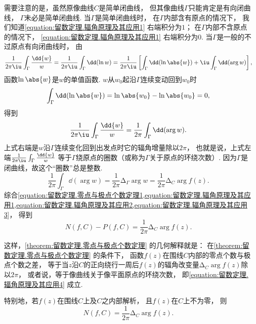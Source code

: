 需要注意的是，虽然原像曲线\(C\)是简单闭曲线，
但其像曲线\(\Gamma\)只能肯定是有向闭曲线，
\(\Gamma\)未必是简单闭曲线.
当\(\Gamma\)是简单闭曲线时，
在\(\Gamma\)内部含有原点的情况下，
我们知道\cref{equation:留数定理.辐角原理及其应用1} 右端积分为\(1\)；
在\(\Gamma\)内部不含原点的情况下，
\cref{equation:留数定理.辐角原理及其应用1} 右端积分为\(0\).
当\(\Gamma\)是一般的不过原点有向闭曲线时，
由\begin{equation*}
	\frac{1}{2\pi\iu} \int_\Gamma \frac{\dd{w}}{w}
	= \frac{1}{2\pi\iu} \int_\Gamma \dd(\ln w)
	= \frac{1}{2\pi\iu} \left[ \int_\Gamma \dd(\ln\abs{w}) + \iu \int_\Gamma \dd(\arg w) \right],
\end{equation*}
函数\(\ln\abs{w}\)是\(w\)的单值函数.
\(w\)从\(w_0\)起沿\(\Gamma\)连续变动回到\(w_0\)时\begin{equation*}
	\int_\Gamma \dd(\ln\abs{w})
	= \ln\abs{w_0} - \ln\abs{w_0} = 0,
\end{equation*}
得到\begin{equation}\label{equation:留数定理.辐角原理及其应用2}
	\frac{1}{2\pi\iu} \int_\Gamma \frac{\dd{w}}{w}
	= \frac{1}{2\pi} \int_\Gamma \dd(\arg w).
\end{equation}
上式右端是\(w\)沿\(\Gamma\)连续变化回到出发点时它的辐角增量除以\(2\pi\)，
也就是说，上式左端\(\frac{1}{2\pi\iu} \int_\Gamma \frac{\dd{w}}{w}\)
等于\(\Gamma\)绕原点的圈数（或称为\(\Gamma\)关于原点的环绕次数）.
因为\(\Gamma\)是闭曲线，故这个“圈数”总是整数.
\begin{equation}\label{equation:留数定理.辐角原理及其应用3}
	\frac{1}{2\pi} \int_\Gamma \dd(\arg w)
	= \frac{1}{2\pi} \increment_\Gamma \arg w
	= \frac{1}{2\pi} \increment_C \arg f(z).
\end{equation}
综合\cref{equation:留数定理.零点与极点个数定理1,equation:留数定理.辐角原理及其应用1,equation:留数定理.辐角原理及其应用2,equation:留数定理.辐角原理及其应用3}，
得到\begin{equation}\label{equation:留数定理.辐角原理及其应用4}
	N(f,C)-P(f,C) = \frac{1}{2\pi} \increment_C \arg f(z).
\end{equation}

这样，\cref{theorem:留数定理.零点与极点个数定理} 的几何解释就是：
在\cref{theorem:留数定理.零点与极点个数定理} 的条件下，
函数\(f(z)\)在围线\(C\)内部的零点个数与极点个数之差，
等于当\(z\)沿\(C\)的正向绕行一周后\(f(z)\)的辐角改变量\(\increment_C \arg f(z)\)除以\(2\pi\)，
或者说，等于像曲线关于像平面原点的环绕次数，
即\cref{equation:留数定理.辐角原理及其应用4} 成立.

特别地，若\(f(z)\)在围线\(C\)上及\(C\)之内部解析，
且\(f(z)\)在\(C\)上不为零，
则\begin{equation}\label{equation:留数定理.辐角原理及其应用5}
	N(f,C) = \frac{1}{2\pi} \increment_C \arg f(z).
\end{equation}

